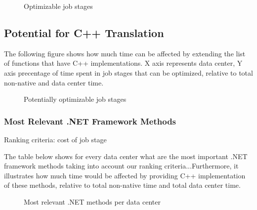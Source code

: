 \begin{figure}[ht]

\caption{Optimizable job stages}
\end{figure}

\subsection{Potential for C++ Translation}

The following figure shows how much time can be affected by extending the list of functions that have C++ implementations. X axis represents data center, Y axis precentage of time spent in job stages that can be optimized, relative to total non-native and data center time.

\begin{figure}[ht]

\caption{Potentially optimizable job stages}
\end{figure}

\subsubsection{Most Relevant .NET Framework Methods}

Ranking criteria: cost of job stage

The table below shows for every data center what are the most important .NET framework methods taking into account our ranking criteria...Furthermore, it illustrates how much time would be affected by providing C++ implementation of these methods, relative to total non-native time and total data center time.

\begin{figure}[ht]

\caption{Most relevant .NET methods per data center}
\end{figure}






